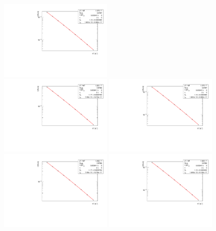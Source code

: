 \begin{figure}[!htbp]
\centering
\includegraphics[width=0.49\textwidth]{default/Ea_Fit_fixn.pdf}\\
\includegraphics[width=0.49\textwidth]{EG112/Ea_Fit_fixn.pdf}
\includegraphics[width=0.49\textwidth]{Syopsys_thermal_velocities/Ea_Fit_fixn.pdf}
\includegraphics[width=0.49\textwidth]{EG112_Syopsys_thermal_velocities/Ea_Fit_fixn.pdf}
\includegraphics[width=0.49\textwidth]{nobgn/Ea_Fit_fixn.pdf}

\end{figure}
